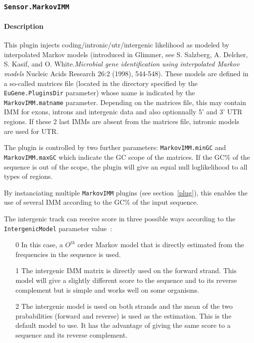 
\subsubsection{\texttt{Sensor.MarkovIMM}}

\paragraph{Description}

This plugin injects coding/intronic/utr/intergenic likelihood as
modeled by interpolated Markov models (introduced in Glimmer, see S.
Salzberg, A. Delcher, S. Kasif, and O. White.{\em Microbial gene
  identification using interpolated Markov models} Nucleic Acids
Research 26:2 (1998), 544-548). These models are defined in a
so-called matrices file (located in the directory specified by the
\texttt{EuGene.PluginsDir} parameter) whose name is indicated by the
\texttt{MarkovIMM.matname} parameter. Depending on the matrices file,
this may contain IMM for exons, introns and intergenic data and also
optionnally 5' and 3' UTR regions. If these 2 last IMMs are absent
from the matrices file, intronic models are used for UTR.

The plugin is controlled by two further parameters:
\texttt{MarkovIMM.minGC} and \texttt{MarkovIMM.maxGC} which indicate
the GC scope of the matrices. If the GC\% of the sequence is out of
the scope, the plugin will give an equal null loglikelihood to all types
of regions.

By instanciating multiple \texttt{MarkovIMM} plugins (see
section~\ref{plug}), this enables the use of several IMM according to
the GC\% of the input sequence. 

The intergenic track can receive score in three possible ways
according to the \texttt{IntergenicModel} parameter value~:
\begin{enumerate}
\item[0] In this case, a $O^{th}$ order Markov model that is directly
  estimated from the frequencies in the sequence is used.
\item[1] The intergenic IMM matrix is directly used on the forward
  strand. This model will give a slightly different score to the
  sequence and to its reverse complement but is simple and works well
  on some organisms.
\item [2] The intergenic model is used on both strands and the mean of
  the two prababilities (forward and reverse) is used as the
  estimation. This is the default model to use. It has the advantage
  of giving the same score to a sequence and its reverse complement.
\end{enumerate}

